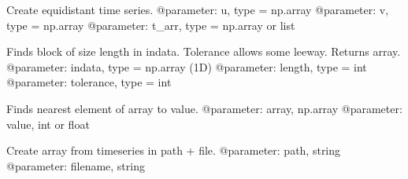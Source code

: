 \documentclass[letterpaper,10pt,english]{sphinxmanual}
\begin{document}

\begin{fulllineitems}
\label{\detokenize{index:windtunnel.equidistant}}
Create equidistant time series.
@parameter: u, type = np.array
@parameter: v, type = np.array
@parameter: t\_arr, type = np.array or list

\end{fulllineitems}


\begin{fulllineitems}
\label{\detokenize{index:windtunnel.find_block}}
Finds block of size length in indata. Tolerance allows some leeway.
Returns array.
@parameter: indata, type = np.array (1D)
@parameter: length, type = int
@parameter: tolerance, type = int

\end{fulllineitems}


\begin{fulllineitems}
\label{\detokenize{index:windtunnel.find_nearest}}
Finds nearest element of array to value.
@parameter: array, np.array
@parameter: value, int or float

\end{fulllineitems}


\begin{fulllineitems}
\label{\detokenize{index:windtunnel.from_file}}
Create array from timeseries in path + file.
@parameter: path, string
@parameter: filename, string

\end{fulllineitems}

\end{document}

